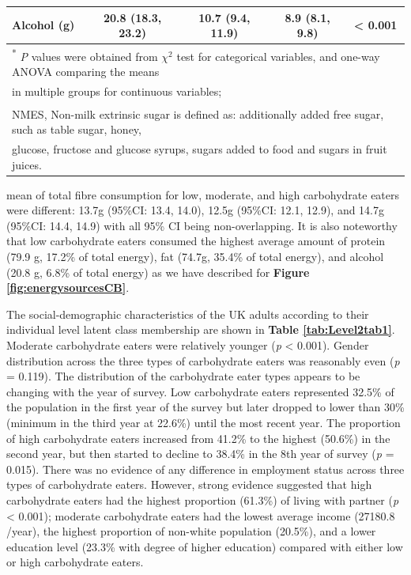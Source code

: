 \begin{table}[H]
\begin{tabular}[t]{lcccc}
		Alcohol (g) & 20.8 (18.3, 23.2) & 10.7 (9.4, 11.9) & 8.9 (8.1, 9.8) & < 0.001\\
		\bottomrule
		\multicolumn{5}{l}{{\scriptsize \textsuperscript{*} \textit{P} values were obtained from $\chi^2$ test for categorical variables, and one-way ANOVA comparing the means}}\\
		\multicolumn{5}{l}{{\scriptsize  in multiple groups for continuous variables;}}\\
		\multicolumn{5}{l}{{\scriptsize \textsuperscript{\dag} NMES, Non-milk extrinsic sugar is defined as: additionally added free sugar, such as table sugar, honey, }}\\
		\multicolumn{5}{l}{{\scriptsize glucose, fructose and glucose syrups, sugars added to food and sugars in fruit juices.}}\\
	\end{tabular}
\end{table}


mean of total fibre consumption for low, moderate, and high carbohydrate eaters were different: 13.7g (95\%CI: 13.4, 14.0), 12.5g (95\%CI: 12.1, 12.9), and 14.7g (95\%CI: 14.4, 14.9) with all 95\% CI being non-overlapping. It is also noteworthy that low carbohydrate eaters consumed the highest average amount of protein (79.9 g, 17.2\% of total energy), fat (74.7g, 35.4\% of total energy), and alcohol (20.8 g, 6.8\% of total energy) as we have described for \textbf{Figure \ref{fig:energysourcesCB}}. 
 
The social-demographic characteristics of the UK adults according to their individual level latent class membership are shown in \textbf{Table \ref{tab:Level2tab1}}. Moderate carbohydrate eaters were relatively younger (\textit{p} < 0.001). Gender distribution across the three types of carbohydrate eaters was reasonably even (\textit{p} = 0.119). The distribution of the carbohydrate eater types appears to be changing with the year of survey. Low carbohydrate eaters represented 32.5\% of the population in the first year of the survey but later dropped to lower than 30\% (minimum in the third year at 22.6\%) until the most recent year. The proportion of high carbohydrate eaters increased from 41.2\% to the highest (50.6\%) in the second year, but then started to decline to 38.4\% in the 8th year of survey (\textit{p} = 0.015). There was no evidence of any difference in employment status across three types of carbohydrate eaters. However, strong evidence suggested that high carbohydrate eaters had the highest proportion (61.3\%) of living with partner (\textit{p} < 0.001); moderate carbohydrate eaters had the lowest average income (27180.8 \textsterling/year), the highest proportion of non-white population (20.5\%), and a lower education level (23.3\% with degree of higher education) compared with either low or high carbohydrate eaters. 


